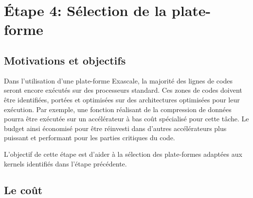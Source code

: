 
\section{Étape 4: Sélection de la plate-forme} \label{sec:methodo_step4}


\subsection{Motivations et objectifs}


Dans l'utilisation d'une plate-forme Exascale, la majorité des lignes de codes seront encore exécutés sur des processeurs standard. Ces zones de codes doivent être identifiées, portées et optimisées sur des architectures optimisées pour leur exécution. Par exemple, une fonction réalisant de la compression de données pourra être exécutée sur un accélérateur à bas coût spécialisé pour cette tâche. Le budget ainsi économisé pour être réinvesti dans d'autres accélérateurs plus puissant et performant pour les parties critiques du code. 

L'objectif de cette étape est d'aider à la sélection des plate-formes adaptées aux kernels identifiés dans l'étape précédente.


\subsection{Le coût}


